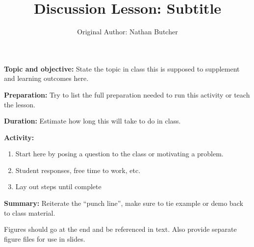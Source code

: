 \documentclass{article}
\title{Discussion Lesson: Subtitle}
\author{Original Author: Nathan Butcher}
\date{}
\begin{document}
\maketitle

\textbf{Topic and objective:} State the topic in class this is supposed to supplement and learning outcomes here. 

\textbf{Preparation:} Try to list the full preparation needed to run this activity or teach the lesson.

\textbf{Duration:} Estimate how long this will take to do in class. 

\hspace{14pt}

\textbf{Activity:}
\begin{enumerate}
\item Start here by posing a question to the class or motivating a problem.
\item Student responses, free time to work, etc.
\item Lay out steps until complete
\end{enumerate}

\textbf{Summary:} Reiterate the ``punch line'', make sure to tie example or demo back to class material.

\hspace{14pt}

Figures should go at the end and be referenced in text. Also provide separate figure files for use in slides.
\end{document}
